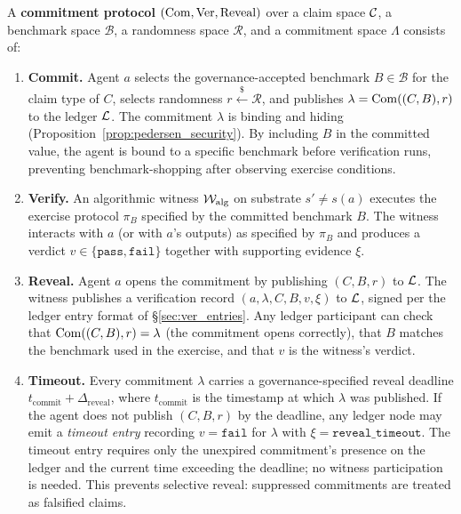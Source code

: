 \begin{definition}
\label{def:commitment_protocol}
A \textbf{commitment protocol} $(\mathrm{Com}, \mathrm{Ver}, \mathrm{Reveal})$
over a claim space $\mathcal{C}$, a benchmark space $\mathcal{B}$, a randomness
space $\mathcal{R}$, and a commitment space $\Lambda$ consists of:
\begin{enumerate}
    \item \textbf{Commit.}  Agent $a$ selects the governance-accepted
    benchmark $B \in \mathcal{B}$ for the claim type of $C$, selects
    randomness $r \xleftarrow{\$} \mathcal{R}$, and publishes
    $\lambda = \mathrm{Com}((C, B), r)$ to the ledger $\mathcal{L}$.  The
    commitment $\lambda$ is binding and hiding
    (Proposition~\ref{prop:pedersen_security}).  By including $B$ in
    the committed value, the agent is bound to a specific benchmark
    before verification runs, preventing benchmark-shopping after
    observing exercise conditions.
    \item \textbf{Verify.}  An algorithmic witness
    $\mathcal{W}_{\mathrm{alg}}$ on substrate $s' \neq s(a)$ executes the
    exercise protocol $\pi_B$ specified by the committed benchmark $B$.
    The witness interacts with $a$ (or with $a$'s outputs) as specified
    by $\pi_B$ and produces a verdict
    $v \in \{\texttt{pass}, \texttt{fail}\}$ together with supporting
    evidence $\xi$.
    \item \textbf{Reveal.}  Agent $a$ opens the commitment by
    publishing $(C, B, r)$ to $\mathcal{L}$.  The witness publishes a
    verification record $(a, \lambda, C, B, v, \xi)$ to $\mathcal{L}$,
    signed per the ledger entry format of \S\ref{sec:ver_entries}.
    Any ledger participant can check that $\mathrm{Com}((C, B), r) = \lambda$
    (the commitment opens correctly), that $B$ matches the benchmark
    used in the exercise, and that $v$ is the witness's verdict.
    \item \textbf{Timeout.}  Every commitment $\lambda$ carries a
    governance-specified reveal deadline
    $t_{\mathrm{commit}} + \Delta_{\mathrm{reveal}}$, where
    $t_{\mathrm{commit}}$ is the timestamp at which $\lambda$ was
    published.  If the agent does not publish $(C, B, r)$ by the
    deadline, any ledger node may emit a \emph{timeout entry}
    recording $v = \texttt{fail}$ for $\lambda$ with
    $\xi = \texttt{reveal\_timeout}$.  The timeout entry requires
    only the unexpired commitment's presence on the ledger and the
    current time exceeding the deadline; no witness participation
    is needed.  This prevents selective reveal: suppressed
    commitments are treated as falsified claims.
\end{enumerate}
\end{definition}

